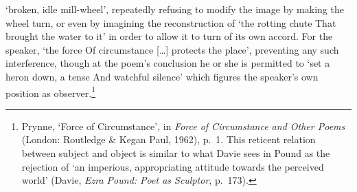 \documentclass[]{article}
\begin{document}
‘broken, idle mill-wheel’, repeatedly refusing to modify the image by
making the wheel turn, or even by imagining the reconstruction of ‘the
rotting chute \textbar{} That brought the water to it’ in order to allow
it to turn of its own accord. For the speaker, ‘the force \textbar{} Of
circumstance {[}\ldots{}{]} protects the place’, preventing any such
interference, though at the poem’s conclusion he or she is permitted to
‘set a heron down, a tense \textbar{} And watchful silence’ which
figures the speaker’s own position as observer.\footnote{Prynne, ‘Force
  of Circumstance’, in \emph{Force of Circumstance and Other Poems}
  (London: Routledge \& Kegan Paul, 1962), p.~1. This reticent relation
  between subject and object is similar to what Davie sees in Pound as
  the rejection of ‘an imperious, appropriating attitude towards the
  perceived world’ (Davie, \emph{Ezra Pound: Poet as Sculptor}, p.~173).}
\end{document}
